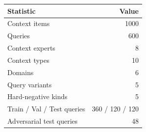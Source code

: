 \begin{tabular}{l r}
\toprule
Statistic & Value \\
\midrule
Context items & 1000 \\
Queries & 600 \\
Context experts & 8 \\
Context types & 10 \\
Domains & 6 \\
Query variants & 5 \\
Hard-negative kinds & 5 \\
Train / Val / Test queries & 360 / 120 / 120 \\
Adversarial test queries & 48 \\
\bottomrule
\end{tabular}
